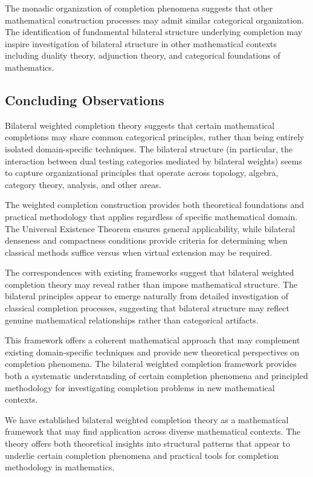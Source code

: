 \documentclass[11pt]{article}
\theoremstyle{plain}
\theoremstyle{definition}
\theoremstyle{remark}
\begin{document}
The monadic organization of completion phenomena suggests that other mathematical construction processes may admit similar categorical organization. The identification of fundamental bilateral structure underlying completion may inspire investigation of bilateral structure in other mathematical contexts including duality theory, adjunction theory, and categorical foundations of mathematics.

\subsection{Concluding Observations}

Bilateral weighted completion theory suggests that certain mathematical completions may share common categorical principles, rather than being entirely isolated domain-specific techniques. The bilateral structure (in particular, the interaction between dual testing categories mediated by bilateral weights) seems to capture organizational principles that operate across topology, algebra, category theory, analysis, and other areas.

The weighted completion construction provides both theoretical foundations and practical methodology that applies regardless of specific mathematical domain. The Universal Existence Theorem ensures general applicability, while bilateral denseness and compactness conditions provide criteria for determining when classical methods suffice versus when virtual extension may be required.

The correspondences with existing frameworks suggest that bilateral weighted completion theory may reveal rather than impose mathematical structure. The bilateral principles appear to emerge naturally from detailed investigation of classical completion processes, suggesting that bilateral structure may reflect genuine mathematical relationships rather than categorical artifacts.

This framework offers a coherent mathematical approach that may complement existing domain-specific techniques and provide new theoretical perspectives on completion phenomena. The bilateral weighted completion framework provides both a systematic understanding of certain completion phenomena and principled methodology for investigating completion problems in new mathematical contexts.

We have established bilateral weighted completion theory as a mathematical framework that may find application across diverse mathematical contexts. The theory offers both theoretical insights into structural patterns that appear to underlie certain completion phenomena and practical tools for completion methodology in mathematics.


\end{document}

